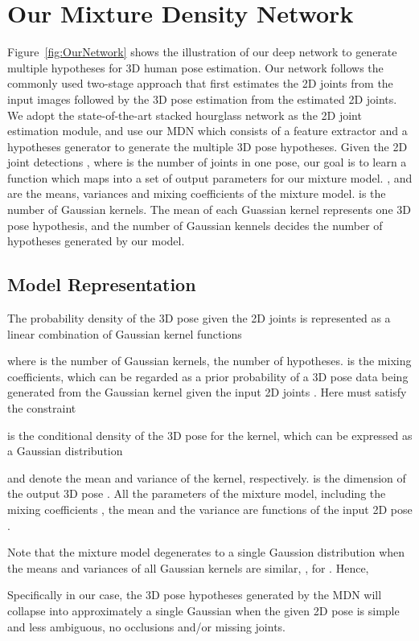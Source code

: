 \documentclass[10pt,twocolumn,letterpaper]{article}
\begin{document}
\section{Our Mixture Density Network}
Figure~\ref{fig:OurNetwork} shows the illustration of our deep network to generate multiple hypotheses for 3D human pose estimation. Our network follows the commonly used two-stage approach that first estimates the 2D joints from the input images followed by the 3D pose estimation from the estimated 2D joints. We adopt the state-of-the-art stacked hourglass \cite{newell2016stacked} network as the 2D joint estimation module, and use our MDN which consists of a feature extractor and a hypotheses generator to generate the multiple 3D pose hypotheses. Given the 2D joint detections , where  is the number of joints in one pose, our goal is to learn a function  which maps  into a set of output parameters  for our mixture model. ,  and  are the means, variances and mixing coefficients of the mixture model.  is the number of Gaussian kernels.   
The mean of each Guassian kernel  represents one 3D pose hypothesis, and the number of Gaussian kennels  decides the number of hypotheses generated by our model.

\subsection{Model Representation}
The probability density of the 3D pose  given the 2D joints  is represented as a linear combination of Gaussian kernel functions

where  is the number of Gaussian kernels, \ie the number of hypotheses.  is the mixing coefficients, which can be regarded as a prior probability of a 3D pose data  being generated from the  Gaussian kernel given the input 2D joints . Here  must satisfy the constraint

 is the conditional density of the 3D pose  for the  kernel, which can be expressed as a Gaussian distribution

 and  denote the mean and variance of the  kernel, respectively.  is the dimension of the output 3D pose . All the parameters of the mixture model, including the mixing coefficients , the mean  and the variance  are functions of the input 2D pose . 

Note that the mixture model degenerates to a single Gaussion distribution when the means and variances of 
all Gaussian kernels are similar, \ie ,  
for . Hence, 

Specifically in our case, the 3D pose hypotheses generated by the MDN will collapse into approximately a single Gaussian when the given 2D pose is simple and less ambiguous, \eg no occlusions and/or missing joints.  
\end{document}
